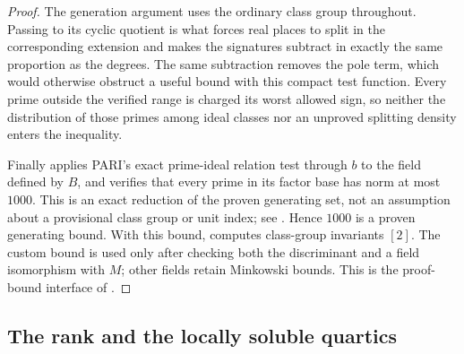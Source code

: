 \begin{proof}
The generation argument uses the ordinary class group throughout.
Passing to its cyclic quotient is what forces real places to split
in the corresponding extension and makes the signatures subtract in
exactly the same proportion as the degrees. The same subtraction
removes the pole term, which would otherwise obstruct a useful bound
with this compact test function. Every prime outside the verified
range is charged its worst allowed sign, so neither the distribution
of those primes among ideal classes nor an unproved splitting density
enters the inequality.

Finally  applies PARI's exact
prime-ideal relation test through $b$ to the field defined by $B$,
and verifies that every prime in its factor base has norm at most
$1000$. This is an exact reduction of the proven generating set,
not an assumption about a provisional class group or unit index;
see \cite{pari}. Hence $1000$ is a proven generating bound.
With this bound,  computes class-group
invariants $[2]$. The custom bound is used only after checking both
the discriminant and a field isomorphism with $M$; other fields retain
Minkowski bounds. This is the proof-bound interface of \cite{magma}.
\end{proof}

\subsection{The rank and the locally soluble quartics}

